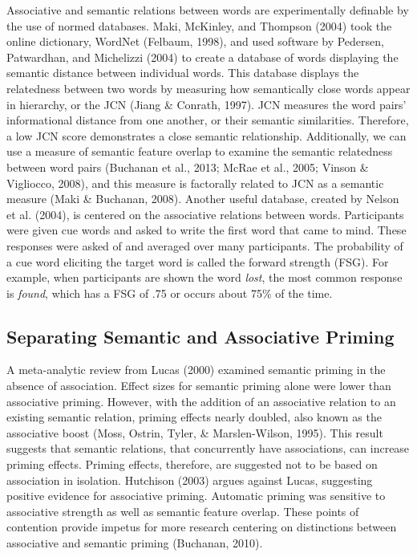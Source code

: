 \documentclass[english,man]{apa6}
\theoremstyle{definition}
\theoremstyle{definition}
\theoremstyle{remark}
\begin{document}
Associative and semantic relations between words are experimentally
definable by the use of normed databases. Maki, McKinley, and Thompson
(2004) took the online dictionary, WordNet (Felbaum, 1998), and used
software by Pedersen, Patwardhan, and Michelizzi (2004) to create a
database of words displaying the semantic distance between individual
words. This database displays the relatedness between two words by
measuring how semantically close words appear in hierarchy, or the JCN
(Jiang \& Conrath, 1997). JCN measures the word pairs' informational
distance from one another, or their semantic similarities. Therefore, a
low JCN score demonstrates a close semantic relationship. Additionally,
we can use a measure of semantic feature overlap to examine the semantic
relatedness between word pairs (Buchanan et al., 2013; McRae et al.,
2005; Vinson \& Vigliocco, 2008), and this measure is factorally related
to JCN as a semantic measure (Maki \& Buchanan, 2008). Another useful
database, created by Nelson et al. (2004), is centered on the
associative relations between words. Participants were given cue words
and asked to write the first word that came to mind. These responses
were asked of and averaged over many participants. The probability of a
cue word eliciting the target word is called the forward strength (FSG).
For example, when participants are shown the word \emph{lost}, the most
common response is \emph{found}, which has a FSG of .75 or occurs about
75\% of the time.

\subsection{Separating Semantic and Associative
Priming}\label{separating-semantic-and-associative-priming}

A meta-analytic review from Lucas (2000) examined semantic priming in
the absence of association. Effect sizes for semantic priming alone were
lower than associative priming. However, with the addition of an
associative relation to an existing semantic relation, priming effects
nearly doubled, also known as the associative boost (Moss, Ostrin,
Tyler, \& Marslen-Wilson, 1995). This result suggests that semantic
relations, that concurrently have associations, can increase priming
effects. Priming effects, therefore, are suggested not to be based on
association in isolation. Hutchison (2003) argues against Lucas,
suggesting positive evidence for associative priming. Automatic priming
was sensitive to associative strength as well as semantic feature
overlap. These points of contention provide impetus for more research
centering on distinctions between associative and semantic priming
(Buchanan, 2010).
\end{document}
